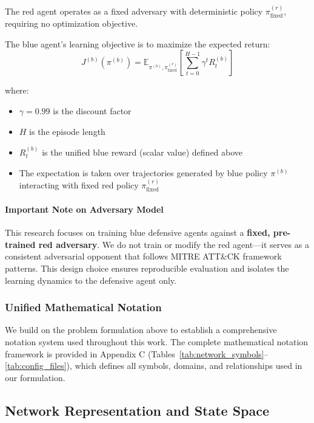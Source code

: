 \documentclass[12pt,oneside]{article}
\begin{document}
The red agent operates as a fixed adversary with deterministic policy $\pi^{(r)}_{\text{fixed}}$, requiring no optimization objective.

The blue agent's learning objective is to maximize the expected return:
\begin{equation}
J^{(b)}(\pi^{(b)}) = \mathbb{E}_{\pi^{(b)}, \pi^{(r)}_{\text{fixed}}}\left[\sum_{t=0}^{H-1} \gamma^t R_t^{(b)}\right]
\end{equation}

where:
\begin{itemize}
\item $\gamma = 0.99$ is the discount factor
\item $H$ is the episode length 
\item $R_t^{(b)}$ is the unified blue reward (scalar value) defined above
\item The expectation is taken over trajectories generated by blue policy $\pi^{(b)}$ interacting with fixed red policy $\pi^{(r)}_{\text{fixed}}$
\end{itemize}

\paragraph{Important Note on Adversary Model} This research focuses on training blue defensive agents against a \textbf{fixed, pre-trained red adversary}. We do not train or modify the red agent—it serves as a consistent adversarial opponent that follows MITRE ATT\&CK framework patterns. This design choice ensures reproducible evaluation and isolates the learning dynamics to the defensive agent only.

\subsubsection{Unified Mathematical Notation}

We build on the problem formulation above to establish a comprehensive notation system used throughout this work. The complete mathematical notation framework is provided in Appendix C (Tables~\ref{tab:network_symbols}--\ref{tab:config_files}), which defines all symbols, domains, and relationships used in our formulation.

\subsection{Network Representation and State Space}
\end{document}
